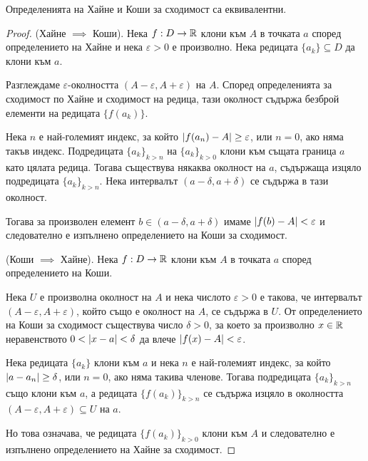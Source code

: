\documentclass[numbers=endperiod, DIV=15, bibliography=totocnumbered]{scrartcl}
\begin{document}
\begin{theorem}\label{thm:heine-iff-cauchy}
  Определенията на Хайне и Коши за сходимост са еквивалентни.
\end{theorem}
\begin{proof}
  (Хайне $\implies$ Коши). Нека $f: D \to \mathbb{R}$ клони към $A$ в точката $a$ според определението на Хайне и нека $\varepsilon > 0$ е произволно. Нека редицата $\{ a_k \} \subseteq D$ да клони към $a$.

  Разглеждаме $\varepsilon$-околността $(A - \varepsilon, A + \varepsilon)$ на $A$. Според определенията за сходимост по Хайне и сходимост на редица, тази околност съдържа безброй елементи на редицата $\{ f(a_k) \}$.

  Нека $n$ е най-големият индекс, за който $\left\vert f(a_n) - A \right\vert \geq \varepsilon$, или $n = 0$, ако няма такъв индекс. Подредицата ${\{ a_k \}}_{k > n}$ на ${\{ a_k \}}_{k > 0}$ клони към същата граница $a$ като цялата редица. Тогава съществува някаква околност на $a$, съдържаща изцяло подредицата ${\{ a_k \}}_{k > n}$. Нека интервалът $(a - \delta, a + \delta)$ се съдържа в тази околност.

  Тогава за произволен елемент $b \in (a - \delta, a + \delta)$ имаме $\left\vert f(b) - A \right\vert < \varepsilon$ и следователно е изпълнено определението на Коши за сходимост.

  (Коши $\implies$ Хайне). Нека $f: D \to \mathbb{R}$ клони към $A$ в точката $a$ според определението на Коши.

  Нека $U$ е произволна околност на $A$ и нека числото $\varepsilon > 0$ е такова, че интервалът $(A - \varepsilon, A + \varepsilon)$, който също е околност на $A$, се съдържа в $U$. От определението на Коши за сходимост съществува число $\delta > 0$, за което за произволно $x \in \mathbb{R}$ неравенството $0 < \left\vert x - a \right\vert < \delta$ да влече $\left\vert f(x) - A \right\vert < \varepsilon$.

  Нека редицата $\{ a_k \}$ клони към $a$ и нека $n$ е най-големият индекс, за който $\left\vert a - a_n \right\vert \geq \delta$, или $n = 0$, ако няма такива членове. Тогава подредицата ${\{ a_k \}}_{k>n}$ също клони към $a$, а редицата ${\{ f(a_k) \}}_{k>n}$ се съдържа изцяло в околността $(A - \varepsilon, A + \varepsilon) \subseteq U$ на $a$.

  Но това означава, че редицата ${\{ f(a_k) \}}_{k>0}$ клони към $A$ и следователно е изпълнено определението на Хайне за сходимост.
\end{proof}
\end{document}
